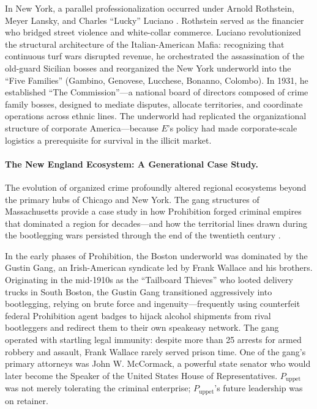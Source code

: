 \documentclass[12pt,openany]{book}
\begin{document}
In New York, a parallel professionalization occurred under Arnold Rothstein, Meyer Lansky, and Charles ``Lucky'' Luciano \cite{ebsco_gangsters}. Rothstein served as the financier who bridged street violence and white-collar commerce. Luciano revolutionized the structural architecture of the Italian-American Mafia: recognizing that continuous turf wars disrupted revenue, he orchestrated the assassination of the old-guard Sicilian bosses and reorganized the New York underworld into the ``Five Families'' (Gambino, Genovese, Lucchese, Bonanno, Colombo). In 1931, he established ``The Commission''---a national board of directors composed of crime family bosses, designed to mediate disputes, allocate territories, and coordinate operations across ethnic lines. The underworld had replicated the organizational structure of corporate America---because $E$'s policy had made corporate-scale logistics a prerequisite for survival in the illicit market.

\paragraph{The New England Ecosystem: A Generational Case Study.}
The evolution of organized crime profoundly altered regional ecosystems beyond the primary hubs of Chicago and New York. The gang structures of Massachusetts provide a case study in how Prohibition forged criminal empires that dominated a region for decades---and how the territorial lines drawn during the bootlegging wars persisted through the end of the twentieth century \cite{wikipedia_gustin, fbi_boston}.

In the early phases of Prohibition, the Boston underworld was dominated by the Gustin Gang, an Irish-American syndicate led by Frank Wallace and his brothers. Originating in the mid-1910s as the ``Tailboard Thieves'' who looted delivery trucks in South Boston, the Gustin Gang transitioned aggressively into bootlegging, relying on brute force and ingenuity---frequently using counterfeit federal Prohibition agent badges to hijack alcohol shipments from rival bootleggers and redirect them to their own speakeasy network. The gang operated with startling legal immunity: despite more than 25 arrests for armed robbery and assault, Frank Wallace rarely served prison time. One of the gang's primary attorneys was John W. McCormack, a powerful state senator who would later become the Speaker of the United States House of Representatives. $P_{\text{uppet}}$ was not merely tolerating the criminal enterprise; $P_{\text{uppet}}$'s future leadership was on retainer.
\end{document}
